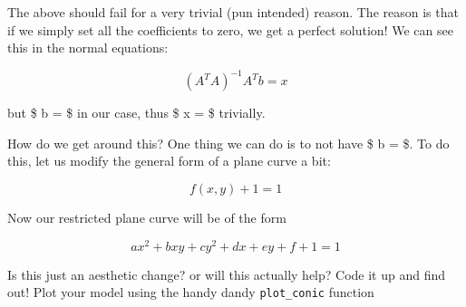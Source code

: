 \documentclass[11pt]{article}
\begin{document}
The above should fail for a very trivial (pun intended) reason. The
reason is that if we simply set all the coefficients to zero, we get a
perfect solution! We can see this in the normal equations:

\[ (A^TA)^{-1} A^T b = x \]

but \$ b =  \$ in our case, thus \$ x =  \$ trivially.

How do we get around this? One thing we can do is to not have \$ b =
 \$. To do this, let us modify the general form of a plane curve a
bit:

\[ f(x,y) + 1 = 1 \]

Now our restricted plane curve will be of the form

\[ ax^2 + bxy + cy^2 + dx + ey + f + 1 = 1 \]

Is this just an aesthetic change? or will this actually help? Code it up
and find out! Plot your model using the handy dandy \texttt{plot\_conic}
function
\end{document}
